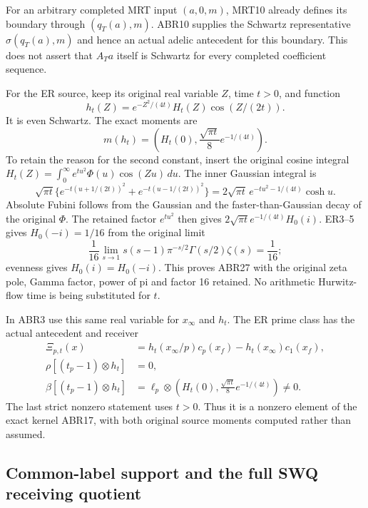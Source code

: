 For an arbitrary completed MRT input $(a,0,m)$, MRT10 already
defines its boundary through $(q_T(a),m)$. ABR10 supplies the
Schwartz representative $\sigma(q_T(a),m)$ and hence an actual
adelic antecedent for this boundary. This does not assert that
$A_Ta$ itself is Schwartz for every completed coefficient sequence.

For the ER source, keep its original real variable $Z$, time $t>0$,
and function
\begin{equation}\tag{ABR26}
 h_t(Z)=e^{-Z^2/(4t)}H_t(Z)\cos(Z/(2t)).
\end{equation}
It is even Schwartz. The exact moments are
\begin{equation}\tag{ABR27}
 m(h_t)=\left(H_t(0),\frac{\sqrt{\pi t}}8e^{-1/(4t)}\right).
\end{equation}
To retain the reason for the second constant, insert the original
cosine integral $H_t(Z)=\int_0^\infty e^{tu^2}\Phi(u)\cos(Zu)\,du$.
The inner Gaussian integral is
\[
 \sqrt{\pi t}\{e^{-t(u+1/(2t))^2}+e^{-t(u-1/(2t))^2}\}
 =2\sqrt{\pi t}\,e^{-tu^2-1/(4t)}\cosh u.
\]
Absolute Fubini follows from the Gaussian and the faster-than-Gaussian
decay of the original $\Phi$. The retained factor $e^{tu^2}$
then gives $2\sqrt{\pi t}e^{-1/(4t)}H_0(i)$.
ER3--5 gives $H_0(-i)=1/16$ from the original limit
\[
 \frac1{16}\lim_{s\to1}
 s(s-1)\pi^{-s/2}\Gamma(s/2)\zeta(s)=\frac1{16};
\]
evenness gives $H_0(i)=H_0(-i)$. This proves ABR27 with the
original zeta pole, Gamma factor, power of pi and factor 16 retained.
No arithmetic Hurwitz-flow time is being substituted for $t$.

In ABR3 use this same real variable for $x_\infty$ and $h_t$.
The ER prime class has the actual antecedent and receiver
\begin{equation}\tag{ABR28}
 \begin{split}
 \Xi_{p,t}(x)
   &=h_t(x_\infty/p)c_p(x_f)-h_t(x_\infty)c_1(x_f),\\
 \rho[(t_p-1)\otimes h_t]&=0,\\
 \beta[(t_p-1)\otimes h_t]
   &=\ell_p\otimes
       \left(H_t(0),\frac{\sqrt{\pi t}}8e^{-1/(4t)}\right)\ne0.
 \end{split}
\end{equation}
The last strict nonzero statement uses $t>0$. Thus it is a
nonzero element of the exact kernel ABR17, with both original
source moments computed rather than assumed.

\subsection{Common-label support and the full SWQ receiving quotient}

